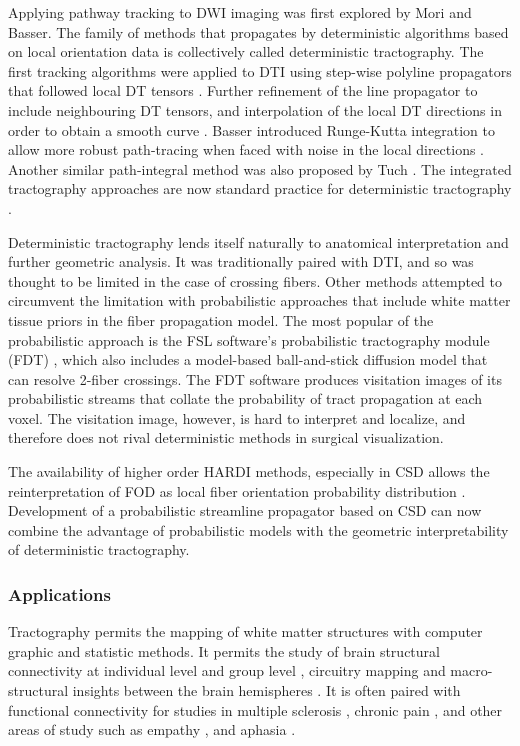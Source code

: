 Applying pathway tracking to DWI imaging was first explored by Mori \cite{Mori2002b} and Basser\cite{Basser2000}. The family of methods that propagates by deterministic algorithms based on local orientation data is collectively called deterministic tractography. The first tracking algorithms were applied to DTI using step-wise polyline propagators that followed local DT tensors \cite{Conturo1999}. Further refinement of the line propagator to include neighbouring DT tensors, and interpolation of the local DT directions in order to obtain a smooth curve \cite{Mori2002b}. Basser introduced Runge-Kutta integration to allow more robust path-tracing when faced with noise in the local directions \cite{Basser2000}. Another similar path-integral method was also proposed by Tuch \cite{Tuch2000d}. The integrated tractography approaches are now standard practice for deterministic tractography \cite{Tournier2004,Pieper2004}. 

Deterministic tractography lends itself naturally to anatomical interpretation and further geometric analysis. It was traditionally paired with DTI, and so was thought to be limited in the case of crossing fibers. Other methods attempted to circumvent the limitation with probabilistic approaches that include white matter tissue priors in the fiber propagation model. The most popular of the probabilistic approach is the FSL software's probabilistic tractography module (FDT) \cite{Behrens2007}, which also includes a model-based ball-and-stick diffusion model that can resolve 2-fiber crossings. The FDT software produces visitation images of its probabilistic streams that collate the probability of tract propagation at each voxel.  The visitation image, however, is hard to interpret and localize, and therefore does not rival deterministic methods in surgical visualization.

The availability of higher order HARDI methods, especially in CSD allows the reinterpretation of FOD as local fiber orientation probability distribution \cite{Tournier2010,Jeurissen2011b}. Development of a probabilistic streamline propagator based on CSD can now combine the advantage of probabilistic models with the geometric interpretability of deterministic tractography. 

\subsubsection{Applications}
Tractography permits the mapping of white matter structures with computer graphic and statistic methods. It permits the study of brain structural connectivity at individual level \cite{Boorman2007} and group level \cite{Meskaldji2013},  circuitry mapping \cite{Kirsch2015} and macro-structural insights between the brain hemispheres \cite{Kucyi2012a}. It is often paired with functional connectivity for studies in multiple sclerosis \cite{Zhong2016,Rocca2007a,Kucyi2015}, chronic pain \cite{Mansour2013,Seifert2011,Wiech2014}, and other areas of study such as empathy \cite{Bernhardt2014}, and aphasia \cite{Catani2013c}.

